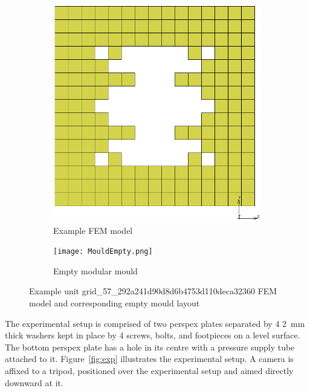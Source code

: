 \begin{figure}[H]
	\centering
	\begin{subfigure}[b]{0.3\textwidth}
		\centering
		\includegraphics[width=\textwidth]{MouldEmptyFEM.png}
		\caption{Example FEM model}
	\end{subfigure}
	\hfill
	\begin{subfigure}[b]{0.6\textwidth}
		\centering
		\texttt{[image: MouldEmpty.png]}
		\caption{Empty modular mould}
	\end{subfigure}
	\caption[Example unit FEM model and mould layout]{Example unit grid\_57\_292a241d90d8d6b4753d110deca32360 FEM model and corresponding empty mould layout}
	\label{fig:emptymould}
\end{figure}

The experimental setup is comprised of two perspex plates separated by 4 \SI{2}{mm} thick washers kept in place by 4 screws, bolts, and footpieces on a level surface. The bottom perspex plate has a hole in its centre with a pressure supply tube attached to it. Figure~\ref{fig:exp} illustrates the experimental setup. A camera is affixed to a tripod, positioned over the experimental setup and aimed directly downward at it.

